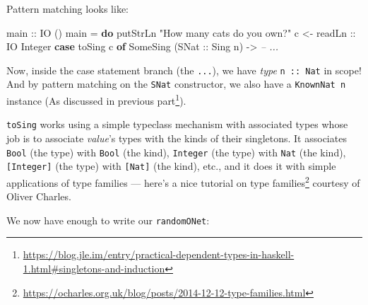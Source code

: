 \documentclass[]{article}
\newenvironment{Shaded}{}{}
\newcommand{\KeywordTok}[1]{\textcolor[rgb]{0.00,0.44,0.13}{\textbf{{#1}}}}
\newcommand{\DataTypeTok}[1]{\textcolor[rgb]{0.56,0.13,0.00}{{#1}}}
\newcommand{\StringTok}[1]{\textcolor[rgb]{0.25,0.44,0.63}{{#1}}}
\newcommand{\CommentTok}[1]{\textcolor[rgb]{0.38,0.63,0.69}{\textit{{#1}}}}
\newcommand{\OtherTok}[1]{\textcolor[rgb]{0.00,0.44,0.13}{{#1}}}
\newcommand{\FunctionTok}[1]{\textcolor[rgb]{0.02,0.16,0.49}{{#1}}}
\newcommand{\NormalTok}[1]{{#1}}
\renewcommand{\href}[2]{#2\footnote{\url{#1}}}
\begin{document}
Pattern matching looks like:

\begin{Shaded}
\begin{Highlighting}[]
\OtherTok{main ::} \DataTypeTok{IO} \NormalTok{()}
\NormalTok{main }\FunctionTok{=} \KeywordTok{do}
    \NormalTok{putStrLn }\StringTok{"How many cats do you own?"}
    \NormalTok{c }\OtherTok{<- readLn ::} \DataTypeTok{IO} \DataTypeTok{Integer}
    \KeywordTok{case} \NormalTok{toSing c }\KeywordTok{of}
      \DataTypeTok{SomeSing} \NormalTok{(}\DataTypeTok{SNat}\OtherTok{ ::} \DataTypeTok{Sing} \NormalTok{n) }\OtherTok{->} \CommentTok{-- ...}
\end{Highlighting}
\end{Shaded}

Now, inside the case statement branch (the \texttt{...}), we have \emph{type}
\texttt{n\ ::\ Nat} in scope! And by pattern matching on the \texttt{SNat}
constructor, we also have a \texttt{KnownNat\ n} instance (As discussed in
\href{https://blog.jle.im/entry/practical-dependent-types-in-haskell-1.html\#singletons-and-induction}{previous
part}).

\texttt{toSing} works using a simple typeclass mechanism with associated types
whose job is to associate \emph{value}'s types with the kinds of their
singletons. It associates \texttt{Bool} (the type) with \texttt{Bool} (the
kind), \texttt{Integer} (the type) with \texttt{Nat} (the kind),
\texttt{{[}Integer{]}} (the type) with \texttt{{[}Nat{]}} (the kind), etc., and
it does it with simple applications of type families --- here's a
\href{https://ocharles.org.uk/blog/posts/2014-12-12-type-families.html}{nice
tutorial on type families} courtesy of Oliver Charles.

We now have enough to write our \texttt{randomONet}:

\begin{Shaded}
\end{Shaded}
\end{document}
